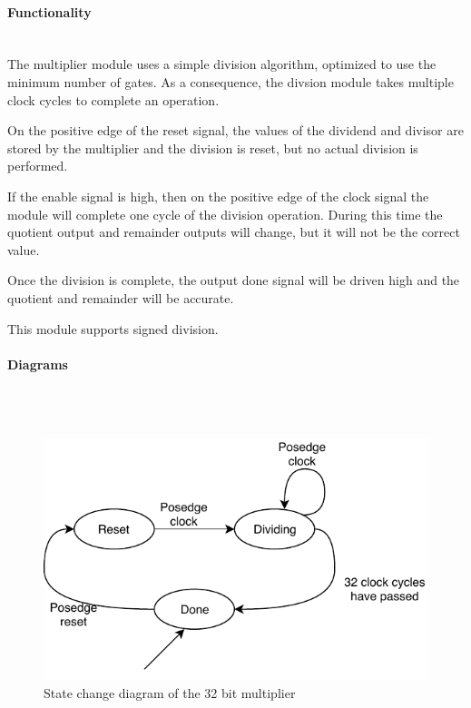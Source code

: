 \documentclass{article}
\begin{document}
    \paragraph{Functionality}
    \hfill\\
    The multiplier module uses a simple division algorithm, optimized
    to use the minimum number of gates. As a consequence, the divsion
    module takes multiple clock cycles to complete an operation.

    On the positive edge of the reset signal, the values of the dividend
    and divisor are stored by the multiplier and the division is
    reset, but no actual division is performed.

    If the enable signal is high, then on the positive edge of the clock
    signal the module will complete one cycle of the division 
    operation. During this time the quotient output and remainder outputs
    will change, but it will not be the correct value.

    Once the division is complete, the output done signal will be driven
    high and the quotient and remainder will be accurate.

    This module supports signed division.

    \paragraph{Diagrams}
    \hfill\\\\
    \begin{figure}[H]
        \centering
        \includegraphics{../diagrams/alu/divider/divider_32.pdf}
        \caption{State change diagram of the 32 bit multiplier}
    \end{figure}
\end{document}
